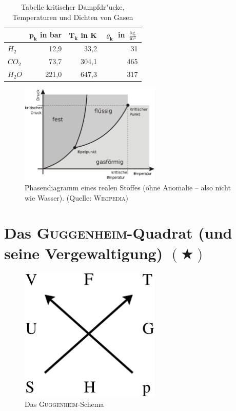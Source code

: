 \begin{table}[h]
   \centering
   \begin{tabular}{l | r r r}
\toprule
      ~ & $\mathbf{p_k}$ in bar & $\mathbf{T_k}$ in K &
      $\mathbf{\varrho_k}$ in
      $\frac{\operatorname{kg}}{\operatorname{m}^3}$ \\
\midrule
      $H_2$ & 12,9 & 33,2 & 31\\
      $CO_2$ & 73,7 & 304,1 & 465 \\
      $H_2O$ & 221,0 & 647,3 & 317 \\
\bottomrule
   \end{tabular}
   \caption{Tabelle kritischer Dampfdr"ucke, Temperaturen und Dichten von Gasen}
   \label{tab_Tk}
\end{table}


\begin{figure}
   \centering
   \includegraphics[width=0.6\textwidth]{bilder/phasen}
   \caption[Phasendiagramm: reales Gas]{Phasendiagramm eines realen Stoffes (ohne Anomalie -- also nicht wie
Wasser). (Quelle: \textsc{Wikipedia})}
   \label{abb_pasendiagramm}
\end{figure}




\clearpage

\section[\textsc{Guggenheim}-Quadrat]{Das \textsc{Guggenheim}-Quadrat (und seine Vergewaltigung) $(\bigstar)$}
\label{kap_guggenheim-quadrat-und-seine-vergewaltigung}



\begin{figure}
   \centering
   \includegraphics[width=0.6\textwidth]{bilder/guggenheim}
   \caption{Das \textsc{Guggenheim}-Schema}
   \label{abb_guggenheim}
\end{figure}


